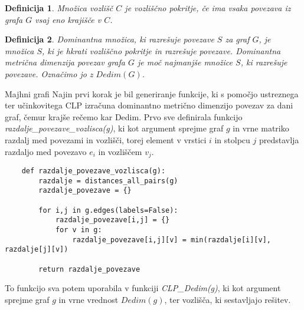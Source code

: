 \documentclass[12pt,a4paper]{amsart}
\makeatletter
\renewcommand\section{\@startsection{section}{1}%
  \z@{.5\linespacing\@plus.7\linespacing}{.5\linespacing}%
  {\normalfont\scshape\large\centering}}
\theoremstyle{plain} %
\newtheorem{definicija}{Definicija}[section]
\makeatother
\begin{document}
    \begin{definicija}
        Množica vozlišč $C$ je \emph{vozliščno pokritje}, če ima vsaka povezava iz grafa $G$ vsaj eno krajišče v $C$.
    \end{definicija}

    \begin{definicija}
        Dominantna množica, ki razrešuje povezave $S$ za graf $G$, je množica $S$, ki je hkrati vozliščno pokritje in razrešuje povezave. Dominantna metrična dimenzija povezav grafa $G$ je moč najmanjše množice $S$, ki razrešuje povezave. Označimo jo z $Dedim(G)$.
    \end{definicija}


\section{Majhni grafi}
    Najin prvi korak je bil generiranje funkcije, ki s pomočjo ustreznega ter učinkovitega CLP izračuna dominantno metrično dimenzijo
    povezav za dani graf, čemur krajše rečemo kar Dedim. Prvo sve definirala funkcijo \emph{razdalje\_povezave\_vozlisca(g)},
    ki kot argument sprejme graf $g$ in vrne matriko razdalj med povezami in vozlišči, torej element v vrstici $i$ in stolpcu $j$ predstavlja razdaljo med povezavo $e_{i}$ in vozliščem $v_{j}$. 

\bigskip
\begin{small}
    \begin{lstlisting}
    def razdalje_povezave_vozlisca(g):
        razdalje = distances_all_pairs(g)
        razdalje_povezave = {}

        for i,j in g.edges(labels=False):
            razdalje_povezave[i,j] = {}
            for v in g:
                razdalje_povezave[i,j][v] = min(razdalje[i][v], razdalje[j][v])

        return razdalje_povezave

    \end{lstlisting}
\end{small}

\bigskip

To funkcijo sva potem uporabila v funkciji \emph{CLP\_Dedim(g)}, ki kot argument sprejme graf $g$ in vrne vrednost $Dedim(g)$, ter
vozlišča, ki sestavljajo rešitev.

\bigskip
\end{document}

